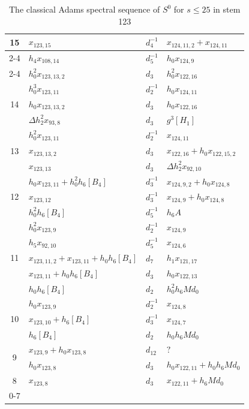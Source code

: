 \documentclass{amsart}
\numberwithin{equation}{section}
\begin{document}
\begin{table}
{\begin{tabular}{|c|l|l|l|}
\multirow{3}{*}{15} & $x_{123,15}$ & $d_{4}^{-1}$ & $x_{124,11,2}+x_{124,11}$ \\\cline{2-4}
 & $h_4x_{108,14}$ & $d_{5}^{-1}$ & $h_0x_{124,9}$ \\\cline{2-4}
 & $h_0^2x_{123,13,2}$ & $d_{3}$ & $h_0^2x_{122,16}$ \\\hline\hline
\multirow{3}{*}{14} & $h_0^3x_{123,11}$ & $d_{2}^{-1}$ & $h_0x_{124,11}$ \\\cline{2-4}
 & $h_0x_{123,13,2}$ & $d_{3}$ & $h_0x_{122,16}$ \\\cline{2-4}
 & $\Delta h_2^2x_{93,8}$ & $d_{3}$ & $g^3[H_1]$ \\\hline\hline
\multirow{3}{*}{13} & $h_0^2x_{123,11}$ & $d_{2}^{-1}$ & $x_{124,11}$ \\\cline{2-4}
 & $x_{123,13,2}$ & $d_{3}$ & $x_{122,16}+h_0x_{122,15,2}$ \\\cline{2-4}
 & $x_{123,13}$ & $d_{3}$ & $\Delta h_2^2x_{92,10}$ \\\hline\hline
\multirow{3}{*}{12} & $h_0x_{123,11}+h_0^2h_6[B_4]$ & $d_{3}^{-1}$ & $x_{124,9,2}+h_0x_{124,8}$ \\\cline{2-4}
 & $x_{123,12}$ & $d_{3}^{-1}$ & $x_{124,9}+h_0x_{124,8}$ \\\cline{2-4}
 & $h_0^2h_6[B_4]$ & $d_{5}^{-1}$ & $h_6A$ \\\hline\hline
\multirow{5}{*}{11} & $h_0^2x_{123,9}$ & $d_{2}^{-1}$ & $x_{124,9}$ \\\cline{2-4}
 & $h_5x_{92,10}$ & $d_{5}^{-1}$ & $x_{124,6}$ \\\cline{2-4}
 & $x_{123,11,2}+x_{123,11}+h_0h_6[B_4]$ & $d_{7}$ & $h_1x_{121,17}$ \\\cline{2-4}
 & $x_{123,11}+h_0h_6[B_4]$ & $d_{3}$ & $h_0x_{122,13}$ \\\cline{2-4}
 & $h_0h_6[B_4]$ & $d_{2}$ & $h_0^2h_6Md_0$ \\\hline\hline
\multirow{3}{*}{10} & $h_0x_{123,9}$ & $d_{2}^{-1}$ & $x_{124,8}$ \\\cline{2-4}
 & $x_{123,10}+h_6[B_4]$ & $d_{3}^{-1}$ & $x_{124,7}$ \\\cline{2-4}
 & $h_6[B_4]$ & $d_{2}$ & $h_0h_6Md_0$ \\\hline\hline
\multirow{2}{*}{9} & $x_{123,9}+h_0x_{123,8}$ & $d_{12}$ & $?$ \\\cline{2-4}
 & $h_0x_{123,8}$ & $d_{3}$ & $h_0x_{122,11}+h_0h_6Md_0$ \\\hline\hline
\multirow{1}{*}{8} & $x_{123,8}$ & $d_{3}$ & $x_{122,11}+h_6Md_0$ \\\hline\hline
\multirow{1}{*}{0-7} & \multicolumn{3}{c|}{}\\\hline
\end{tabular}}
\caption{The classical Adams spectral sequence of $S^0$ for $s \le 25$ in stem 123}
\label{Table:S123}
\end{table}
\end{document}

